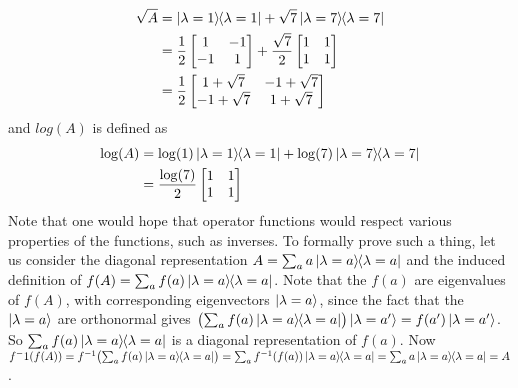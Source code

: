 \begin{align*}
	\sqrt{A} &= \ket{\lambda = 1}\hspace{-1mm} \bra{\lambda = 1} + \sqrt{7} \ket{\lambda = 7}\hspace{-1mm} \bra{\lambda = 7}\\
		&= \frac{1}{2} \begin{bmatrix}
		1 & -1 \\
		-1 & 1
		\end{bmatrix}
		+
		\frac{\sqrt{7}}{2} \begin{bmatrix}
		1 & 1 \\
		1 & 1
		\end{bmatrix}\\
		&=
		\frac{1}{2}
		 \begin{bmatrix}
			1+\sqrt{7} & -1+\sqrt{7} \\
			-1 + \sqrt{7} & 1+\sqrt{7}
		\end{bmatrix}
\end{align*}
and $log(A)$ is defined as
 \begin{align*}
 	\log (A) &=  \log (1) \ket{\lambda = 1}\hspace{-1mm} \bra{\lambda = 1} + \log (7) \ket{\lambda = 7}\hspace{-1mm} \bra{\lambda = 7}\\
 		&= \frac{\log (7)}{2} \begin{bmatrix}
	 		1 & 1 \\
	 		1 & 1
 		\end{bmatrix}
 \end{align*}
Note that one would hope that operator functions would respect various properties of the functions, such as inverses. To formally prove such a thing, let us consider the diagonal representation $A=\sum_a a\ket{\lambda=a}\hspace{-1mm} \bra{\lambda=a}$ and the induced definition of $f(A)=\sum_a f(a)\ket{\lambda = a}\hspace{-1mm} \bra{\lambda = a}$.  Note that the $f(a)$ are eigenvalues of $f(A)$, with corresponding eigenvectors $\ket{\lambda=a}$, since the fact that the $\ket{\lambda=a}$ are orthonormal gives $\bigl(\sum_a f(a) \ket{\lambda=a}\hspace{-1mm} \bra{\lambda=a}\bigr)\ket{\lambda=a'} = f(a')\ket{\lambda=a'}$.  So $\sum_a f(a)\ket{\lambda = a}\hspace{-1mm} \bra{\lambda = a}$ is a diagonal representation of $f(a)$.  Now $f^-1(f(A)) = f^{-1}\bigl(\sum_a f(a)\ket{\lambda=a}\hspace{-1mm} \bra{\lambda=a}\bigr) = \sum_a f^{-1}(f(a))\ket{\lambda=a}\hspace{-1mm} \bra{\lambda=a} = \sum_a a \ket{\lambda=a}\hspace{-1mm} \bra{\lambda=a} = A$.

